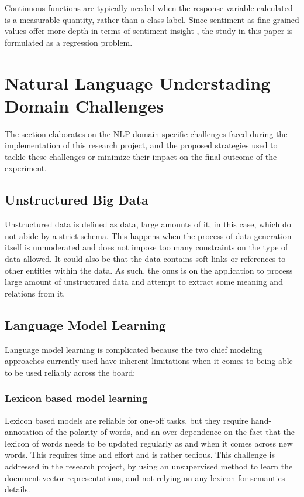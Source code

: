 \documentclass[conference]{IEEEtran}
\begin{document}
        Continuous functions are typically needed when the response variable calculated is a measurable quantity, rather than a class label. Since sentiment as fine-grained values offer more depth in terms of sentiment insight \cite{drake2008sentiment}, the study in this paper is formulated as a regression problem.

\vspace{5mm}

\section{Natural Language Understading Domain Challenges}
    The section elaborates on the NLP domain-specific challenges faced during the implementation of this research project, and the proposed strategies used to tackle these challenges or minimize their impact on the final outcome of the experiment.

    \subsection{Unstructured Big Data}
        Unstructured data is defined as data, large amounts of it, in this case, which do not abide by a strict schema\cite{buneman1996query}. This happens when the process of data generation itself is unmoderated and does not impose too many constraints on the type of data allowed. It could also be that the data contains soft links or references to other entities within the data. As such, the onus is on the application to process large amount of unstructured data and attempt to extract some meaning and relations from it.

    \subsection{Language Model Learning}
        Language model learning is complicated because the two chief modeling approaches currently used have inherent limitations when it comes to being able to be used reliably across the board:
        
        \subsubsection{Lexicon based model learning}
            Lexicon based models are reliable for one-off tasks, but they require hand-annotation of the polarity of words, and an over-dependence on the fact that the lexicon of words needs to be updated regularly as and when it comes across new words. This requires time and effort and is rather tedious. This challenge is addressed in the research project, by using an unsupervised method to learn the document vector representations, and not relying on any lexicon for semantics details.
\end{document}

